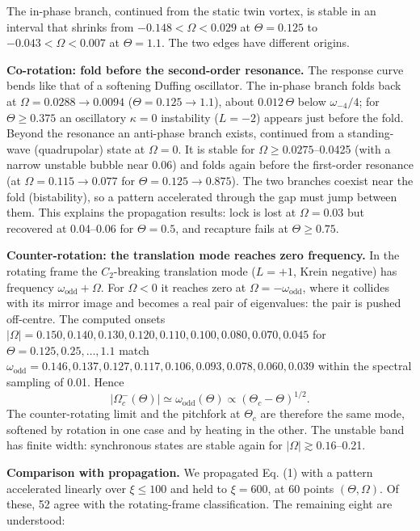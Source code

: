 The in-phase branch, continued from the static twin vortex, is stable in an interval that shrinks from \(-0.148 < \Omega < 0.029\) at \(\Theta = 0.125\) to \(-0.043 < \Omega < 0.007\) at \(\Theta = 1.1\). The two edges have different origins.

\textbf{Co-rotation: fold before the second-order resonance.} The response curve bends like that of a softening Duffing oscillator. The in-phase branch folds back at \(\Omega = 0.0288 \to 0.0094\) (\(\Theta = 0.125 \to 1.1\)), about \(0.012\,\Theta\) below \(\omega_{-4}/4\); for \(\Theta \ge 0.375\) an oscillatory \(\kappa = 0\) instability (\(L = -2\)) appears just before the fold. Beyond the resonance an anti-phase branch exists, continued from a standing-wave (quadrupolar) state at \(\Omega = 0\). It is stable for \(\Omega \ge 0.0275\)--0.0425 (with a narrow unstable bubble near 0.06) and folds again before the first-order resonance (at \(\Omega = 0.115 \to 0.077\) for \(\Theta = 0.125 \to 0.875\)). The two branches coexist near the fold (bistability), so a pattern accelerated through the gap must jump between them. This explains the propagation results: lock is lost at \(\Omega = 0.03\) but recovered at 0.04--0.06 for \(\Theta = 0.5\), and recapture fails at \(\Theta \ge 0.75\).

\textbf{Counter-rotation: the translation mode reaches zero frequency.} In the rotating frame the \(C_2\)-breaking translation mode (\(L = +1\), Krein negative) has frequency \(\omega_\mathrm{odd} + \Omega\). For \(\Omega < 0\) it reaches zero at \(\Omega = -\omega_\mathrm{odd}\), where it collides with its mirror image and becomes a real pair of eigenvalues: the pair is pushed off-centre. The computed onsets \(|\Omega| = 0.150, 0.140, 0.130, 0.120, 0.110, 0.100, 0.080, 0.070, 0.045\) for \(\Theta = 0.125, 0.25, \dots, 1.1\) match \(\omega_\mathrm{odd} = 0.146, 0.137, 0.127, 0.117, 0.106, 0.093, 0.078, 0.060, 0.039\) within the spectral sampling of 0.01. Hence
\[ |\Omega_c^-(\Theta)| \simeq \omega_\mathrm{odd}(\Theta) \propto (\Theta_c - \Theta)^{1/2}. \tag{6} \]
The counter-rotating limit and the pitchfork at \(\Theta_c\) are therefore the same mode, softened by rotation in one case and by heating in the other. The unstable band has finite width: synchronous states are stable again for \(|\Omega| \gtrsim 0.16\)--0.21.

\textbf{Comparison with propagation.} We propagated Eq. (1) with a pattern accelerated linearly over \(\xi \le 100\) and held to \(\xi = 600\), at 60 points \((\Theta, \Omega)\). Of these, 52 agree with the rotating-frame classification. The remaining eight are understood:

